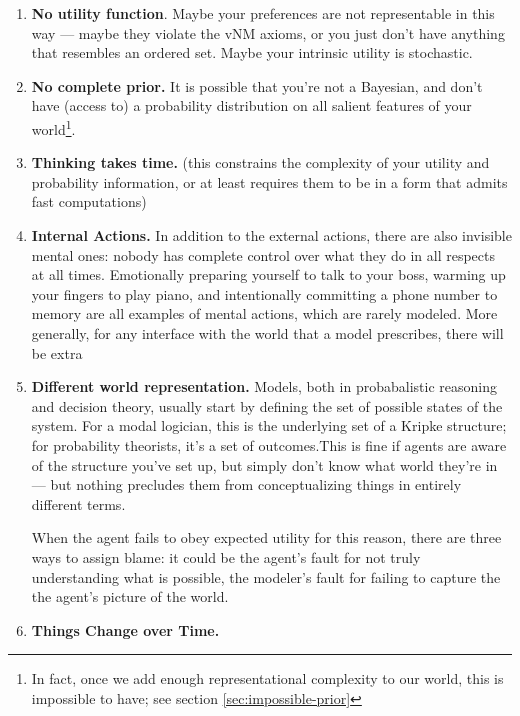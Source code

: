 \documentclass{article}
\begin{document}
	\begin{enumerate}
		\item \textbf{No utility function}. Maybe your preferences are not representable in this way --- maybe they violate the vNM axioms, or you just don't have anything that resembles an ordered set. Maybe your intrinsic utility is stochastic.
		
		\item \textbf{No complete prior.} It is possible that you're not a Bayesian, and don't have (access to) a probability distribution on all salient features of your world\footnote{In fact, once we add enough representational complexity to our world, this is impossible to have; see section \ref{sec:impossible-prior}}.  
		
		\item \textbf{Thinking takes time.} (this constrains the complexity of your utility and probability information, or at least requires them to be in a form that admits fast computations)
		
		\item \textbf{Internal Actions.} In addition to the external actions, there are also invisible mental ones: nobody has complete control over what they do in all respects at all times. Emotionally preparing yourself to talk to your boss, warming up your fingers to play piano, and intentionally committing a phone number to memory are all examples of mental actions, which are rarely modeled. More generally, for any interface with the world that a model prescribes, there will be extra 
		
		\item \textbf{Different world representation.} 
		Models, both in probabalistic reasoning and decision theory, usually start by defining the set of possible states of the system. For a modal logician, this is the underlying set of a Kripke structure; for probability theorists, it's a set of outcomes.This is fine if agents are aware of the structure you've set up, but simply don't know what world they're in --- but nothing precludes them from conceptualizing things in entirely different terms. 
		
		When the agent fails to obey expected utility for this reason, there are three ways to assign blame: it could be the agent's fault for not truly understanding what is possible, the modeler's fault for failing to capture the the agent's picture of the world.
		
		
		
		\item \textbf{Things Change over Time.}
	\end{enumerate}	
	
\end{document}
